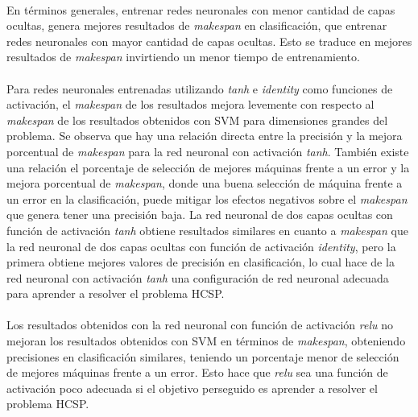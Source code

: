 \paragraph{} En términos generales, entrenar redes neuronales con menor cantidad de capas ocultas, genera mejores resultados de \textit{makespan} en clasificación, que entrenar redes neuronales con mayor cantidad de capas ocultas.
Esto se traduce en mejores resultados de \textit{makespan} invirtiendo un menor tiempo de entrenamiento. 

\paragraph{} Para redes neuronales entrenadas utilizando \textit{tanh} e \textit{identity} como funciones de activación, el \textit{makespan} de los resultados mejora levemente con respecto al \textit{makespan} de los resultados obtenidos con SVM para dimensiones grandes del problema.
Se observa que hay una relación directa entre la precisión y la mejora porcentual de \textit{makespan} para la red neuronal con activación \textit{tanh}. También existe una relación el porcentaje de selección de mejores máquinas frente a un error y la mejora porcentual de \textit{makespan}, donde una buena selección de máquina frente a un error en la clasificación, puede mitigar los efectos negativos sobre el \textit{makespan} que genera tener una precisión baja. La red neuronal de dos capas ocultas con función de activación \textit{tanh} obtiene resultados similares en cuanto a \textit{makespan} que la red neuronal de dos capas ocultas con función de activación \textit{identity}, pero la primera obtiene mejores valores de precisión en clasificación, lo cual hace de la red neuronal con activación \textit{tanh} una configuración de red neuronal adecuada para aprender a resolver el problema HCSP.

\paragraph{} Los resultados obtenidos con la red neuronal con función de activación \textit{relu} no mejoran los resultados obtenidos con SVM en términos de \textit{makespan}, obteniendo precisiones en clasificación similares, teniendo un porcentaje menor de selección de mejores máquinas frente a un error. Esto hace que \textit{relu} sea una función de activación poco adecuada si el objetivo perseguido es aprender a resolver el problema HCSP.
